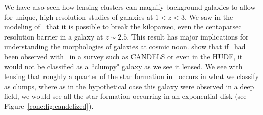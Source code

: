 We have also seen how lensing clusters can magnify background galaxies to allow for unique, high resolution studies of galaxies at $1<z<3$. We saw in the modeling of \cluster\ that it is possible to break the kiloparsec, even the centaparsec resolution barrier in a galaxy at $z\sim2.5$. This result has major implications for understanding the morphologies of galaxies at cosmic noon. \citet{Rigby:2017qy} show that if \giantarc\ had been observed with \hst\ in a survey such as CANDELS or even in the HUDF, it would not be classified as a ``clumpy" galaxy as we see it lensed. We see with lensing that roughly a quarter of the star formation in \giantarc\ occurs in what we classify as clumps, where as in the hypothetical case this galaxy were observed in a deep field, we would see all the star formation occurring in an exponential disk (see Figure~\ref{conc:fig:candelized}).

